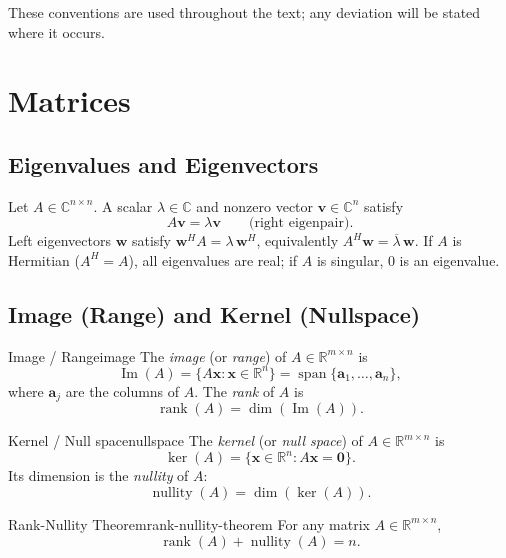 \documentclass[../../main.tex]{subfiles}
\begin{document}
These conventions are used throughout the text; any deviation will be stated where it occurs.

\section{Matrices}
\label{sec:matrices}

\subsection{Eigenvalues and Eigenvectors}
\label{subsec:eigs}
Let $A\in\mathbb{C}^{n\times n}$. A scalar $\lambda\in\mathbb{C}$ and nonzero vector $\mathbf{v}\in\mathbb{C}^n$ satisfy
\[
    A\mathbf{v}=\lambda\mathbf{v}\qquad\text{(right eigenpair)}.
\]
Left eigenvectors $\mathbf{w}$ satisfy $\mathbf{w}^H A = \lambda \, \mathbf{w}^H$, equivalently $A^H\mathbf{w}=\overline{\lambda}\,\mathbf{w}$. If $A$ is Hermitian ($A^H=A$), all eigenvalues are real; if $A$ is singular, $0$ is an eigenvalue.

\subsection{Image (Range) and Kernel (Nullspace)}
\label{subsec:image-kernel}

\begin{definition}{Image / Range}{image}
    The \emph{image} (or \emph{range}) of $A\in\mathbb{R}^{m\times n}$ is
    \[
        \operatorname{Im}(A)=\{A\mathbf{x}:\mathbf{x}\in\mathbb{R}^n\} =\operatorname{span}\{\mathbf{a}_1,\dots,\mathbf{a}_n\},
    \]
    where $\mathbf{a}_j$ are the columns of $A$. The \emph{rank} of $A$ is
    \[
        \operatorname{rank}(A)=\dim(\operatorname{Im}(A)).
    \]
\end{definition}

\begin{definition}{Kernel / Null space}{nullspace}
    The \emph{kernel} (or \emph{null space}) of $A\in\mathbb{R}^{m\times n}$ is
    \[
        \ker(A)=\{\mathbf{x}\in\mathbb{R}^n: A\mathbf{x}=\mathbf{0}\}.
    \]
    Its dimension is the \emph{nullity} of $A$:
    \[
        \operatorname{nullity}(A)=\dim(\ker(A)).
    \]
\end{definition}

\begin{theorem}{Rank-Nullity Theorem}{rank-nullity-theorem}
    For any matrix $A\in\mathbb{R}^{m\times n}$,
    \[
        \operatorname{rank}(A)+\operatorname{nullity}(A)=n.
    \]
\end{theorem}
\end{document}
